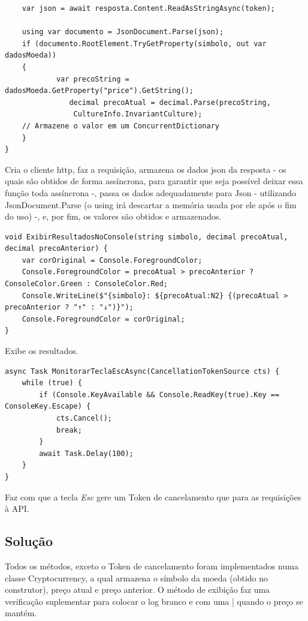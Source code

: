 \documentclass[
	12pt,				%
	oneside,			%
	a4paper,			%
	english,			%
	brazil,				%
	]{abntex2}
\begin{document}
{\begin{lstlisting}
	var json = await resposta.Content.ReadAsStringAsync(token);

	using var documento = JsonDocument.Parse(json);
	if (documento.RootElement.TryGetProperty(simbolo, out var dadosMoeda))    
    {
    	    var precoString = dadosMoeda.GetProperty("price").GetString();
    	       decimal precoAtual = decimal.Parse(precoString, 
                CultureInfo.InvariantCulture);
    // Armazene o valor em um ConcurrentDictionary
    }
}
\end{lstlisting}

Cria o cliente http, faz a requisição, armazena os dados json da resposta - os quais são obtidos de forma assíncrona, para garantir que seja possível deixar essa função toda assíncrona -, passa os dados adequadamente para Json - utilizando JsonDocument.Parse (o using irá descartar a memória usada por ele após o fim do uso) -, e, por fim, os valores são obtidos e armazenados.

\begin{lstlisting}
void ExibirResultadosNoConsole(string simbolo, decimal precoAtual, decimal precoAnterior) {
	var corOriginal = Console.ForegroundColor;
	Console.ForegroundColor = precoAtual > precoAnterior ? ConsoleColor.Green : ConsoleColor.Red;
	Console.WriteLine($"{simbolo}: ${precoAtual:N2} {(precoAtual > precoAnterior ? "↑" : "↓")}");
	Console.ForegroundColor = corOriginal;
}
\end{lstlisting}

Exibe os resultados.

\begin{lstlisting}
async Task MonitorarTeclaEscAsync(CancellationTokenSource cts) {
	while (true) {
    	if (Console.KeyAvailable && Console.ReadKey(true).Key == ConsoleKey.Escape) {
        	cts.Cancel();
        	break;
    	}
    	await Task.Delay(100);
	}
}
\end{lstlisting}

Faz com que a tecla \textit{Esc} gere um Token de cancelamento que para as requisições à API.

\subsection{Solução}

Todos os métodos, exceto o Token de cancelamento foram implementados numa classe Cryptocurrency, a qual armazena o símbolo da moeda (obtido no construtor), preço atual e preço anterior. O método de exibição faz uma verificação suplementar para colocar o log branco e com uma | quando o preço se mantém.

}
\end{document}
